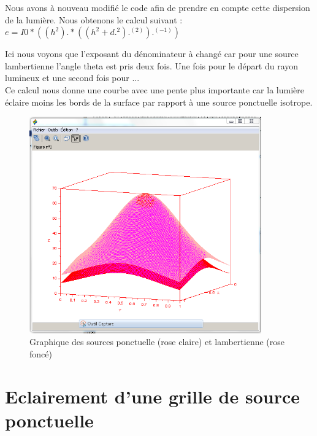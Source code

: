 \documentclass{article}
\begin{document}
  \newpage
  
  Nous avons à nouveau modifié le code afin de prendre en compte cette dispersion de la 
  lumière. Nous obtenons le calcul suivant :
  $ e = I0 * ((h^2) .* ((h^2 + d.^2).^(2)).^(-1)) $
  
  Ici nous voyons que l'exposant du dénominateur à changé car pour une source lambertienne 
  l'angle theta est pris deux fois. Une fois pour le départ du rayon lumineux et une second 
  fois pour ...\\
  
  Ce calcul nous donne une courbe avec une pente plus importante car la lumière éclaire moins
  les bords de la surface par rapport à une source ponctuelle isotrope.\\
  
  \begin{figure}[!h]
    \begin{center}
      \includegraphics[width=10cm]{../iso_lamb.PNG}
      \caption{Graphique des sources ponctuelle (rose claire) et lambertienne (rose foncé)}
    \end{center}
  \end{figure}
  
  \newpage
  
  \section{Eclairement d'une grille de source ponctuelle}
    
\end{document}
